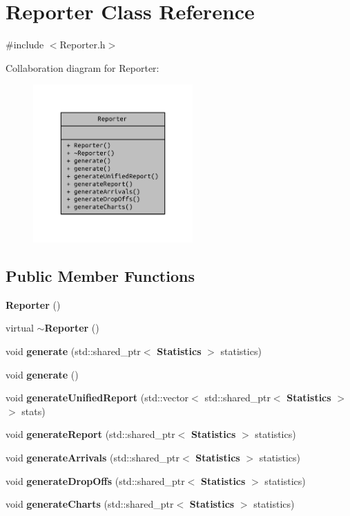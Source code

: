 \section{Reporter Class Reference}
\label{class_reporter}


{\ttfamily \#include $<$Reporter.\+h$>$}



Collaboration diagram for Reporter\+:
\nopagebreak
\begin{figure}[H]
\begin{center}
\leavevmode
\includegraphics[width=173pt]{class_reporter__coll__graph}
\end{center}
\end{figure}
\subsection*{Public Member Functions}
\begin{DoxyCompactItemize}
\item 
{\bf Reporter} ()
\item 
virtual {\bf $\sim$\+Reporter} ()
\item 
void {\bf generate} (std\+::shared\+\_\+ptr$<$ {\bf Statistics} $>$ statistics)
\item 
void {\bf generate} ()
\item 
void {\bf generate\+Unified\+Report} (std\+::vector$<$ std\+::shared\+\_\+ptr$<$ {\bf Statistics} $>$$>$ stats)
\item 
void {\bf generate\+Report} (std\+::shared\+\_\+ptr$<$ {\bf Statistics} $>$ statistics)
\item 
void {\bf generate\+Arrivals} (std\+::shared\+\_\+ptr$<$ {\bf Statistics} $>$ statistics)
\item 
void {\bf generate\+Drop\+Offs} (std\+::shared\+\_\+ptr$<$ {\bf Statistics} $>$ statistics)
\item 
void {\bf generate\+Charts} (std\+::shared\+\_\+ptr$<$ {\bf Statistics} $>$ statistics)
\end{DoxyCompactItemize}


